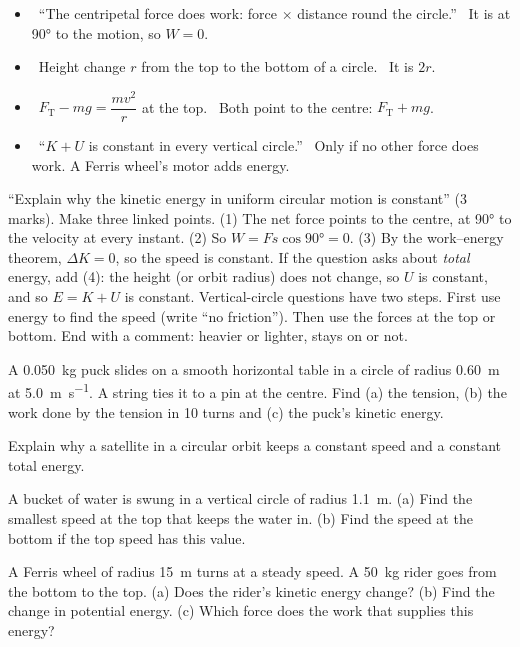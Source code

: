 \begin{mistakes}
\begin{itemize}
  \item \xmark\ ``The centripetal force does work: force $\times$ distance round the circle.''
        \cmark\ It is at \ang{90} to the motion, so $W = 0$.
  \item \xmark\ Height change $r$ from the top to the bottom of a circle. \cmark\ It is $2r$.
  \item \xmark\ $F_\mathrm{T} - mg = \dfrac{mv^2}{r}$ at the top. \cmark\ Both point to the centre:
        $F_\mathrm{T} + mg$.
  \item \xmark\ ``$K + U$ is constant in every vertical circle.'' \cmark\ Only if no other force
        does work. A Ferris wheel's motor adds energy.
\end{itemize}
\end{mistakes}

\begin{examtip}
``Explain why the kinetic energy in uniform circular motion is constant'' (3 marks). Make three
linked points. (1) The net force points to the centre, at \ang{90} to the velocity at every
instant. (2) So $W = Fs\cos\ang{90} = 0$. (3) By the work--energy theorem, $\Delta K = 0$, so the
speed is constant. If the question asks about \emph{total} energy, add (4): the height (or orbit
radius) does not change, so $U$ is constant, and so $E = K + U$ is constant.
Vertical-circle questions have two steps. First use energy to find the speed (write ``no
friction''). Then use the forces at the top or bottom. End with a comment: heavier or lighter,
stays on or not.
\end{examtip}

\begin{quickcheck}
  \item A \qty{0.050}{kg} puck slides on a smooth horizontal table in a circle of radius
        \qty{0.60}{m} at \qty{5.0}{m.s^{-1}}. A string ties it to a pin at the centre. Find (a) the
        tension, (b) the work done by the tension in 10 turns and (c) the puck's kinetic energy.
  \item Explain why a satellite in a circular orbit keeps a constant speed and a constant total energy.
  \item A bucket of water is swung in a vertical circle of radius \qty{1.1}{m}. (a) Find the
        smallest speed at the top that keeps the water in. (b) Find the speed at the bottom if the
        top speed has this value.
  \item A Ferris wheel of radius \qty{15}{m} turns at a steady speed. A \qty{50}{kg} rider goes from
        the bottom to the top. (a) Does the rider's kinetic energy change? (b) Find the change in
        potential energy. (c) Which force does the work that supplies this energy?
\end{quickcheck}

